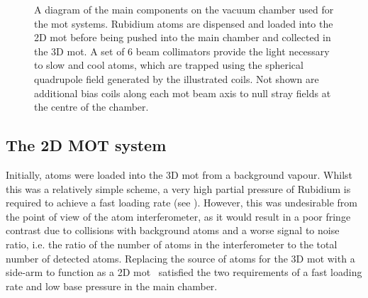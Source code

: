 \begin{figure}
    \centering
    \def\svgwidth{1\textwidth}
    
    \caption[\ac{mot} system component diagram]{A diagram of the main components on the vacuum chamber used for the \ac{mot} systems. Rubidium atoms are dispensed and loaded into the 2D \ac{mot} before being pushed into the main chamber and collected in the 3D \ac{mot}. A set of 6 beam collimators provide the light necessary to slow and cool atoms, which are trapped using the spherical quadrupole field generated by the illustrated coils. Not shown are additional bias coils along each \ac{mot} beam axis to null stray fields at the centre of the chamber.}
    \label{fig:mot_system}
\end{figure}   
\subsection{The 2D MOT system}\label{sec:2d_mot}
Initially, atoms were loaded into the 3D \ac{mot} from a background vapour. Whilst this was a relatively simple scheme, a very high partial pressure of Rubidium is required to achieve a fast loading rate (see ). However, this was undesirable from the point of view of the atom interferometer, as it would result in a poor fringe contrast due to collisions with background atoms and a worse signal to noise ratio, i.e. the ratio of the number of atoms in the interferometer to the total number of detected atoms. Replacing the source of atoms for the 3D \ac{mot} with a side-arm to function as a 2D \ac{mot}~\cite{Dieckmann1998} satisfied the two requirements of a fast loading rate and low base pressure in the main chamber. \par\noindent
